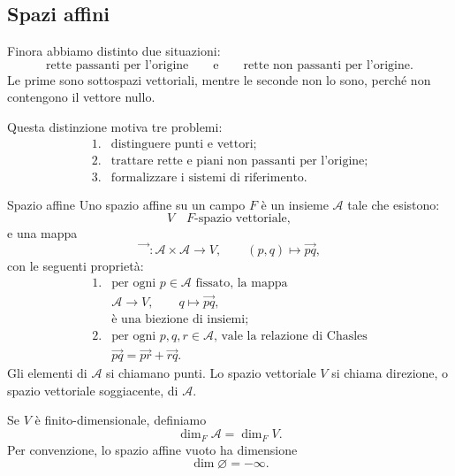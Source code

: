 \documentclass[a4paper]{article}
\begin{document}
\subsection{Spazi affini}

Finora abbiamo distinto due situazioni:
\[
    \text{rette passanti per l'origine}
    \qquad
    \text{e}
    \qquad
    \text{rette non passanti per l'origine}.
\]
Le prime sono sottospazi vettoriali, mentre le seconde non lo sono, perché non contengono il vettore nullo.

Questa distinzione motiva tre problemi:
\[
    \begin{array}{ll}
        \text{1.} & \text{distinguere punti e vettori;}\\
        \text{2.} & \text{trattare rette e piani non passanti per l'origine;}\\
        \text{3.} & \text{formalizzare i sistemi di riferimento.}
    \end{array}
\]

\begin{snippetdefinition}{Spazio affine}
    Uno spazio affine su un campo \(F\) è un insieme \(\mathcal{A}\) tale che esistono:
    \[
        V \quad \text{\(F\)-spazio vettoriale},
    \]
    e una mappa
    \[
        \overrightarrow{\phantom{pq}}:\mathcal{A}\times\mathcal{A}\to V,
        \qquad
        (p,q)\mapsto \overrightarrow{pq},
    \]
    con le seguenti proprietà:
    \[
        \begin{array}{ll}
            \text{1.} &
            \text{per ogni \(p\in\mathcal{A}\) fissato, la mappa}
            \\
            &
            \mathcal{A}\to V,
            \qquad
            q\mapsto \overrightarrow{pq},
            \\
            &
            \text{è una biezione di insiemi;}\\[2mm]
            \text{2.} &
            \text{per ogni \(p,q,r\in\mathcal{A}\), vale la relazione di Chasles}
            \\
            &
            \overrightarrow{pq}
            =
            \overrightarrow{pr}
            +
            \overrightarrow{rq}.
        \end{array}
    \]
    Gli elementi di \(\mathcal{A}\) si chiamano punti. Lo spazio vettoriale \(V\) si chiama direzione, o spazio vettoriale soggiacente, di \(\mathcal{A}\).
\end{snippetdefinition}

Se \(V\) è finito-dimensionale, definiamo
\[
    \dim_F \mathcal{A}=\dim_F V.
\]
Per convenzione, lo spazio affine vuoto ha dimensione
\[
    \dim \varnothing=-\infty.
\]
\end{document}
